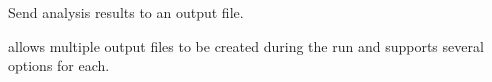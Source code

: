 


Send analysis results to an output file.

\Xyce{} allows multiple output files to be created during the run and
supports several options for each.

\newenvironment{PrintCommandTable}[1]
               {\renewcommand{\arraystretch}{1.2}
                 \newcommand{\category}[1]{\multicolumn{3}{c}{\smallskip\color{XyceDarkBlue}\em\bfseries ##1}}
                 \begin{longtable}{>{\ttfamily\small}m{3in}<{\normalfont}>{\raggedright\small}m{1.75in}>{\raggedright\let\\\tabularnewline\small}m{1.75in}}
                   \caption{#1} \\ \hline
                   \rowcolor{XyceDarkBlue}
                   \color{white}\normalfont\bf Trigger &
                   \color{white}\bf Files &
                   \color{white}\bf Columns/Description \endfirsthead
                   \caption[]{#1} \\ \hline
                   \rowcolor{XyceDarkBlue}
                   \color{white}\normalfont\bf Trigger &
                   \color{white}\bf Files &
                   \color{white}\bf Columns/Description \endhead}
               {\end{longtable}}

